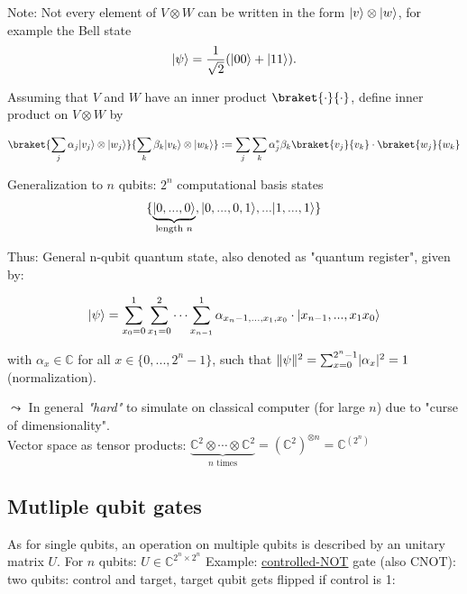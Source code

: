 Note: Not every element of $V \otimes W$ can be written in the form $\lvert v\rangle \otimes \lvert w\rangle$,
for example the Bell state
\begin{equation*}
    \lvert\psi\rangle = \frac{1}{\sqrt{2}} (\lvert00\rangle + \lvert11\rangle).
\end{equation*}

Assuming that $V$ and $W$ have an inner product $\braket{\cdot}{\cdot}$, define inner product
on $V \otimes W$ by

\begin{equation}
    \braket{\sum_j \alpha_j \ket{v_j} \otimes \ket{w_j}}
        {\sum_k \beta_k \ket{v_k} \otimes \ket{w_k}} :=
    \sum_j \sum_k \alpha_j^* \beta_k \braket{v_j}{v_k}\cdot \braket{w_j}{w_k}
\end{equation}


Generalization to $n$ qubits: $2^n$ computational basis states
\begin{equation*}
    \{\underbrace{\lvert0, ..., 0\rangle}_{\text{length $n$}}, \lvert0, ..., 0, 1\rangle, ... \lvert1,...,1\rangle\}
\end{equation*}

Thus: General n-qubit quantum state, also denoted as "quantum register", given by:

\begin{equation}
    \lvert\psi\rangle = \sum_{x_0 = 0}^1 \sum_{x_1 = 0}^2 \cdots \sum_{x_{n-1}}^1 \alpha_{x_n-1,..., x_1, x_0}
        \cdot \lvert x_{n-1},..., x_1 x_0\rangle
\end{equation}

with $\alpha_x \in \mathbb{C}$ for all $x \in \{0, ..., 2^n - 1\}$, such that 
$\lVert\psi\rVert^2 = \sum_{x = 0}^{2^n - 1} \lvert\alpha_x\rvert^2 = 1$ (normalization).

$\leadsto$ In general \textit{"hard"} to simulate on classical computer (for large $n$) due to "curse of dimensionality". \\
Vector space as tensor products: 
$\underbrace{\mathbb{C}^2 \otimes \cdots \otimes \mathbb{C}^2}_{\text{$n$ times}} 
= (\mathbb{C}^2)^{\otimes n} = \mathbb{C}^{(2^n)}$

\subsection{Mutliple qubit gates}

As for single qubits, an operation on multiple qubits is described by an unitary matrix $U$.
For $n$ qubits: $U \in \mathbb{C}^{2^n \times 2^n}$
\newpage
%
Example: \underline{controlled-NOT} gate (also CNOT): \\
two qubits: {\color{orange}control} and target, target qubit gets flipped if {\color{orange}control} is 1: \\

